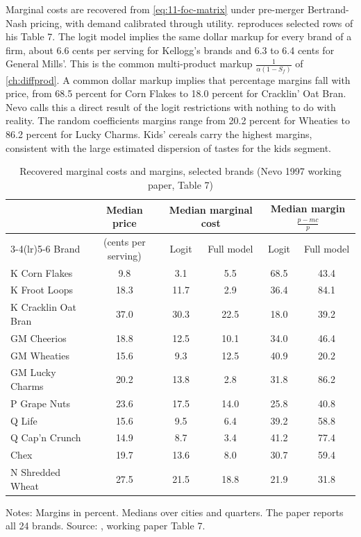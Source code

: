  Marginal costs are recovered from \eqref{eq:11-foc-matrix} under pre-merger
Bertrand-Nash pricing, with demand calibrated through utility.  reproduces selected rows of his
Table 7. The logit model implies the same dollar markup for every brand of a firm, about 6.6 cents per serving for
Kellogg's brands and 6.3 to 6.4 cents for General Mills'. This is the common multi-product markup
$\frac{1}{\alpha(1 - S_f)}$ of \cref{ch:diffprod}. A common dollar markup implies that percentage margins fall with
price, from 68.5 percent for Corn Flakes to 18.0 percent for Cracklin' Oat Bran. Nevo calls this a direct result of the
logit restrictions with nothing to do with reality. The random coefficients margins range from 20.2 percent for Wheaties
to 86.2 percent for Lucky Charms. Kids' cereals carry the highest margins, consistent with the large estimated
dispersion of tastes for the kids segment.

\begin{table}[htbp]
\centering
\caption{Recovered marginal costs and margins, selected brands (Nevo 1997 working paper, Table 7)}
\label{tab:11-nevo-mc}
\small
\begin{tabular}{@{}lccccc@{}}
\toprule
 & Median price & \multicolumn{2}{c}{Median marginal cost} & \multicolumn{2}{c}{Median margin $\frac{p - mc}{p}$} \\
\cmidrule(lr){3-4}\cmidrule(lr){5-6}
Brand & (cents per serving) & Logit & Full model & Logit & Full model \\
\midrule
K Corn Flakes        &  9.8 &  3.1 &  5.5 & 68.5 & 43.4 \\
K Froot Loops        & 18.3 & 11.7 &  2.9 & 36.4 & 84.1 \\
K Cracklin Oat Bran  & 37.0 & 30.3 & 22.5 & 18.0 & 39.2 \\
GM Cheerios          & 18.8 & 12.5 & 10.1 & 34.0 & 46.4 \\
GM Wheaties          & 15.6 &  9.3 & 12.5 & 40.9 & 20.2 \\
GM Lucky Charms      & 20.2 & 13.8 &  2.8 & 31.8 & 86.2 \\
P Grape Nuts         & 23.6 & 17.5 & 14.0 & 25.8 & 40.8 \\
Q Life               & 15.6 &  9.5 &  6.4 & 39.2 & 58.8 \\
Q Cap'n Crunch       & 14.9 &  8.7 &  3.4 & 41.2 & 77.4 \\
Chex                 & 19.7 & 13.6 &  8.0 & 30.7 & 59.4 \\
N Shredded Wheat     & 27.5 & 21.5 & 18.8 & 21.9 & 31.8 \\
\bottomrule
\end{tabular}

\smallskip
\begin{minipage}{0.9\linewidth}
\footnotesize
Notes: Margins in percent. Medians over cities and quarters. The paper reports all 24 brands. Source:
\citet{Nevo2000b}, working paper Table 7.
\end{minipage}
\end{table}


